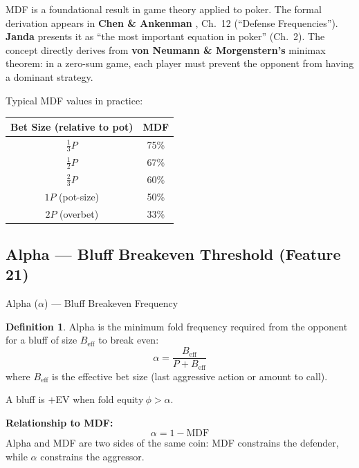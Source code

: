 \documentclass[11pt, a4paper]{article}
\theoremstyle{definition}
\newtheorem{definition}{Definition}[section]
\begin{document}
\begin{refbox}
MDF is a foundational result in game theory applied to poker. The formal derivation appears in \textbf{Chen \& Ankenman} \cite{chen2006}, Ch.~12 (``Defense Frequencies''). \textbf{Janda} \cite{janda2017} presents it as ``the most important equation in poker'' (Ch.~2). The concept directly derives from \textbf{von Neumann \& Morgenstern's} \cite{vonneumann1944} minimax theorem: in a zero-sum game, each player must prevent the opponent from having a dominant strategy.

Typical MDF values in practice:
\begin{center}
\begin{tabular}{cc}
\toprule
Bet Size (relative to pot) & MDF \\
\midrule
$\frac{1}{3}P$ & 75\% \\
$\frac{1}{2}P$ & 67\% \\
$\frac{2}{3}P$ & 60\% \\
$1P$ (pot-size) & 50\% \\
$2P$ (overbet) & 33\% \\
\bottomrule
\end{tabular}
\end{center}
\end{refbox}

\subsection{Alpha --- Bluff Breakeven Threshold (Feature 21)}

\begin{featurebox}{Alpha ($\alpha$) --- Bluff Breakeven Frequency}
\begin{definition}
Alpha is the minimum fold frequency required from the opponent for a bluff of size $B_{\text{eff}}$ to break even:
\begin{equation}
    \boxed{\alpha = \frac{B_{\text{eff}}}{P + B_{\text{eff}}}}
\end{equation}
where $B_{\text{eff}}$ is the effective bet size (last aggressive action or amount to call).

A bluff is $+$EV when $\text{fold equity}\ \phi > \alpha$.
\end{definition}

\textbf{Relationship to MDF:}
\begin{equation}
    \alpha = 1 - \text{MDF}
\end{equation}
Alpha and MDF are two sides of the same coin: MDF constrains the defender, while $\alpha$ constrains the aggressor.
\end{featurebox}
\end{document}
